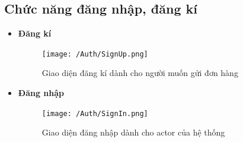 \subsection{Chức năng đăng nhập, đăng kí}

	\begin{itemize}
		\item \textbf{Đăng kí}
			\begin{figure}[H]
				\texttt{[image: /Auth/SignUp.png]}
				\centering
				\caption{Giao diện đăng kí dành cho người muốn gửi đơn hàng}
			\end{figure}
		
		\item \textbf{Đăng nhập}
		\begin{figure}[H]
			\texttt{[image: /Auth/SignIn.png]}
			\centering
			\caption{Giao diện đăng nhập dành cho actor của hệ thống}
		\end{figure}
	\end{itemize}

